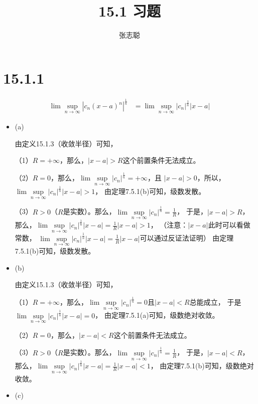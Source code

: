\documentclass{article}
\begin{document}
\title{15.1 习题}
\author{张志聪}
\maketitle

\section*{15.1.1}
\begin{align*}
  \lim\sup\limits_{n \to \infty} |c_n(x -a)^n|^\frac{1}{n}
   & = \lim\sup\limits_{n \to \infty} |c_n|^\frac{1}{n}|x -a|
\end{align*}

\begin{itemize}
  \item (a)

        由定义15.1.3（收敛半径）可知，

        （1）$R = + \infty$，那么，$|x - a| > R$这个前置条件无法成立。

        （2）$R = 0$，那么，$\lim\sup\limits_{n \to \infty} |c_n|^\frac{1}{n} = +\infty$，且
        $|x - a| > 0$，所以，$\lim\sup\limits_{n \to \infty} |c_n|^\frac{1}{n}|x -a| > 1$，
        由定理7.5.1(b)可知，级数发散。

        （3）$R > 0$（$R$是实数）。那么，$\lim\sup\limits_{n \to \infty} |c_n|^\frac{1}{n} = \frac{1}{R}$，
        于是，$|x - a| > R$，
        那么，$\lim\sup\limits_{n \to \infty} |c_n|^\frac{1}{n}|x - a| = \frac{1}{R} |x - a| > 1$，
        （注意：$|x - a|$此时可以看做常数，
        $\lim\sup\limits_{n \to \infty} |c_n|^\frac{1}{n}|x - a| = \frac{1}{R} |x - a|$可以通过反证法证明）
        由定理7.5.1(b)可知，级数发散。
  \item (b)

        由定义15.1.3（收敛半径）可知，

        （1）$R = + \infty$，那么，$\lim\sup\limits_{n \to \infty} |c_n|^\frac{1}{n} = 0$且$|x - a| < R$总能成立，
        于是$\lim\sup\limits_{n \to \infty} |c_n|^\frac{1}{n}|x -a| = 0$，
        由定理7.5.1(a)可知，级数绝对收敛。

        （2）$R = 0$，那么，$|x - a| < R$这个前置条件无法成立。

        （3）$R > 0$（$R$是实数）。那么，$\lim\sup\limits_{n \to \infty} |c_n|^\frac{1}{n} = \frac{1}{R}$，
        于是，$|x - a| < R$，
        那么，$\lim\sup\limits_{n \to \infty} |c_n|^\frac{1}{n}|x - a| = \frac{1}{R} |x - a| < 1$，
        由定理7.5.1(b)可知，级数绝对收敛。
  \item (c)


\end{itemize}
\end{document}
